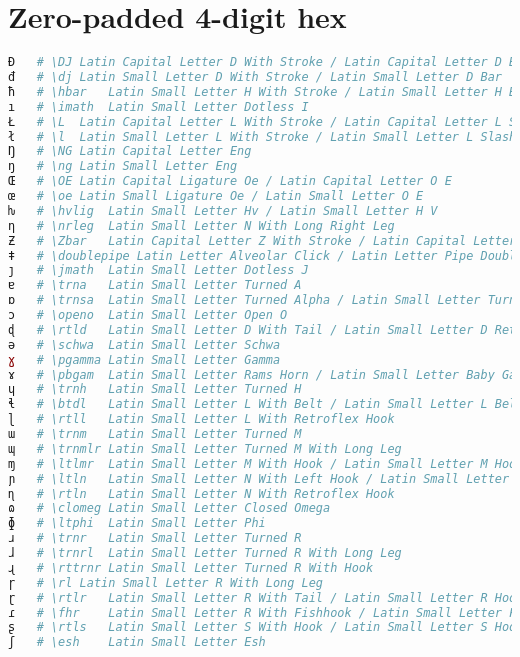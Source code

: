 \section{Zero-padded 4-digit hex}
\begin{lstlisting}[language=Julia, style=julia, linewidth=\textwidth]
Đ   # \DJ Latin Capital Letter D With Stroke / Latin Capital Letter D Bar
đ   # \dj Latin Small Letter D With Stroke / Latin Small Letter D Bar
ħ   # \hbar   Latin Small Letter H With Stroke / Latin Small Letter H Bar
ı   # \imath  Latin Small Letter Dotless I
Ł   # \L  Latin Capital Letter L With Stroke / Latin Capital Letter L Slash
ł   # \l  Latin Small Letter L With Stroke / Latin Small Letter L Slash
Ŋ   # \NG Latin Capital Letter Eng
ŋ   # \ng Latin Small Letter Eng
Œ   # \OE Latin Capital Ligature Oe / Latin Capital Letter O E
œ   # \oe Latin Small Ligature Oe / Latin Small Letter O E
ƕ   # \hvlig  Latin Small Letter Hv / Latin Small Letter H V
ƞ   # \nrleg  Latin Small Letter N With Long Right Leg
Ƶ   # \Zbar   Latin Capital Letter Z With Stroke / Latin Capital Letter Z Bar
ǂ   # \doublepipe Latin Letter Alveolar Click / Latin Letter Pipe Double Bar
ȷ   # \jmath  Latin Small Letter Dotless J
ɐ   # \trna   Latin Small Letter Turned A
ɒ   # \trnsa  Latin Small Letter Turned Alpha / Latin Small Letter Turned Script A
ɔ   # \openo  Latin Small Letter Open O
ɖ   # \rtld   Latin Small Letter D With Tail / Latin Small Letter D Retroflex Hook
ə   # \schwa  Latin Small Letter Schwa
ɣ   # \pgamma Latin Small Letter Gamma
ɤ   # \pbgam  Latin Small Letter Rams Horn / Latin Small Letter Baby Gamma
ɥ   # \trnh   Latin Small Letter Turned H
ɬ   # \btdl   Latin Small Letter L With Belt / Latin Small Letter L Belt
ɭ   # \rtll   Latin Small Letter L With Retroflex Hook
ɯ   # \trnm   Latin Small Letter Turned M
ɰ   # \trnmlr Latin Small Letter Turned M With Long Leg
ɱ   # \ltlmr  Latin Small Letter M With Hook / Latin Small Letter M Hook
ɲ   # \ltln   Latin Small Letter N With Left Hook / Latin Small Letter N Hook
ɳ   # \rtln   Latin Small Letter N With Retroflex Hook
ɷ   # \clomeg Latin Small Letter Closed Omega
ɸ   # \ltphi  Latin Small Letter Phi
ɹ   # \trnr   Latin Small Letter Turned R
ɺ   # \trnrl  Latin Small Letter Turned R With Long Leg
ɻ   # \rttrnr Latin Small Letter Turned R With Hook
ɼ   # \rl Latin Small Letter R With Long Leg
ɽ   # \rtlr   Latin Small Letter R With Tail / Latin Small Letter R Hook
ɾ   # \fhr    Latin Small Letter R With Fishhook / Latin Small Letter Fishhook R
ʂ   # \rtls   Latin Small Letter S With Hook / Latin Small Letter S Hook
ʃ   # \esh    Latin Small Letter Esh

\end{lstlisting}
